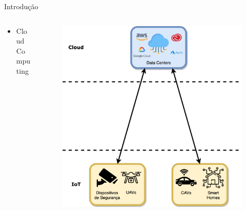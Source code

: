 
\begin{frame}{Introdução}
    \begin{columns}[T]
        \begin{column}{.5\textwidth}
            \begin{itemize}
                \item Cloud Computing
            \end{itemize}
        \end{column}

        \begin{column}{.5\textwidth}
            \begin{figure}
                \centering
                \includegraphics[width=\textwidth]{Figuras/TCC Cloud IoT.png}
            \end{figure}
        \end{column}
    \end{columns}
\end{frame}

